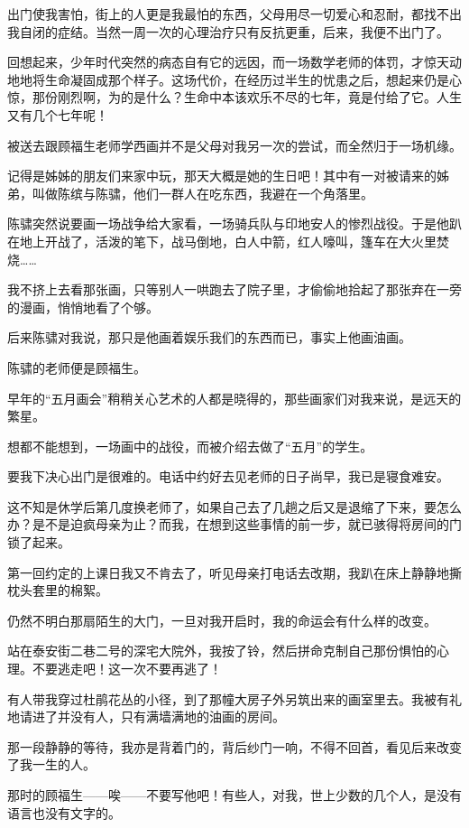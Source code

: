 \par 出门使我害怕，街上的人更是我最怕的东西，父母用尽一切爱心和忍耐，都找不出我自闭的症结。当然一周一次的心理治疗只有反抗更重，后来，我便不出门了。
\par 回想起来，少年时代突然的病态自有它的远因，而一场数学老师的体罚，才惊天动地地将生命凝固成那个样子。这场代价，在经历过半生的忧患之后，想起来仍是心惊，那份刚烈啊，为的是什么？生命中本该欢乐不尽的七年，竟是付给了它。人生又有几个七年呢！
\par 被送去跟顾福生老师学西画并不是父母对我另一次的尝试，而全然归于一场机缘。
\par 记得是姊姊的朋友们来家中玩，那天大概是她的生日吧！其中有一对被请来的姊弟，叫做陈缤与陈骕，他们一群人在吃东西，我避在一个角落里。
\par 陈骕突然说要画一场战争给大家看，一场骑兵队与印地安人的惨烈战役。于是他趴在地上开战了，活泼的笔下，战马倒地，白人中箭，红人嚎叫，篷车在大火里焚烧……
\par 我不挤上去看那张画，只等别人一哄跑去了院子里，才偷偷地拾起了那张弃在一旁的漫画，悄悄地看了个够。
\par 后来陈骕对我说，那只是他画着娱乐我们的东西而已，事实上他画油画。
\par 陈骕的老师便是顾福生。
\par 早年的“五月画会”稍稍关心艺术的人都是晓得的，那些画家们对我来说，是远天的繁星。
\par 想都不能想到，一场画中的战役，而被介绍去做了“五月”的学生。
\par 要我下决心出门是很难的。电话中约好去见老师的日子尚早，我已是寝食难安。
\par 这不知是休学后第几度换老师了，如果自己去了几趟之后又是退缩了下来，要怎么办？是不是迫疯母亲为止？而我，在想到这些事情的前一步，就已骇得将房间的门锁了起来。
\par 第一回约定的上课日我又不肯去了，听见母亲打电话去改期，我趴在床上静静地撕枕头套里的棉絮。
\par 仍然不明白那扇陌生的大门，一旦对我开启时，我的命运会有什么样的改变。
\par 站在泰安街二巷二号的深宅大院外，我按了铃，然后拼命克制自己那份惧怕的心理。不要逃走吧！这一次不要再逃了！
\par 有人带我穿过杜鹃花丛的小径，到了那幢大房子外另筑出来的画室里去。我被有礼地请进了并没有人，只有满墙满地的油画的房间。
\par 那一段静静的等待，我亦是背着门的，背后纱门一响，不得不回首，看见后来改变了我一生的人。
\par 那时的顾福生——唉——不要写他吧！有些人，对我，世上少数的几个人，是没有语言也没有文字的。
